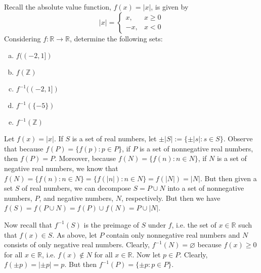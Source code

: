 \documentclass[11pt,letterpaper]{article}
\begin{document}
 Recall the absolute value function, $f(x)= |x|$, is given by
	\[
	|x|= 
	\begin{cases}
	x, & x \geq 0 \\
	-x, & x < 0 
	\end{cases}
	\]
Considering $f: \mathbb{R} \to \mathbb{R}$, determine the following sets:
	\begin{enumerate}[(a)]
	\item $f((-2, 1])$
	\item $f(\mathbb{Z})$
	\item $f^{-1}((-2,1])$
	\item $f^{-1}(\{-5\})$
	\item $f^{-1}(\mathbb{Z})$
	\end{enumerate} \pspace

\sol Let $f(x)= |x|$. If $S$ is a set of real numbers, let $\pm |S|:= \{ \pm |s| \colon s \in S \}$. Observe that because $f(P)= \{ f(p) \colon p \in P \}$, if $P$ is a set of nonnegative real numbers, then $f(P)= P$. Moreover, because $f(N)= \{ f(n) \colon n \in N \}$, if $N$ is a set of negative real numbers, we know that $f(N)= \{ f(n) \colon n \in N \}= \{ f(|n|) \colon n \in N \}= f(|N|)= |N|$. But then given a set $S$ of real numbers, we can decompose $S= P \cup N$ into a set of nonnegative numbers, $P$, and negative numbers, $N$, respectively. But then we have $f(S)= f(P \cup N)= f(P) \cup f(N)= P \cup |N|$. \pspace

Now recall that $f^{-1}(S)$ is the preimage of $S$ under $f$, i.e. the set of $x \in \mathbb{R}$ such that $f(x) \in S$. As above, let $P$ contain only nonnegative real numbers and $N$ consists of only negative real numbers. Clearly, $f^{-1}(N)= \varnothing$ because $f(x) \geq 0$ for all $x \in \mathbb{R}$, i.e. $f(x) \notin N$ for all $x \in \mathbb{R}$. Now let $p \in P$. Clearly, $f(\pm p)= | \pm p|= p$. But then $f^{-1}(P)= \{ \pm p \colon p \in P \}$. 
\end{document}

